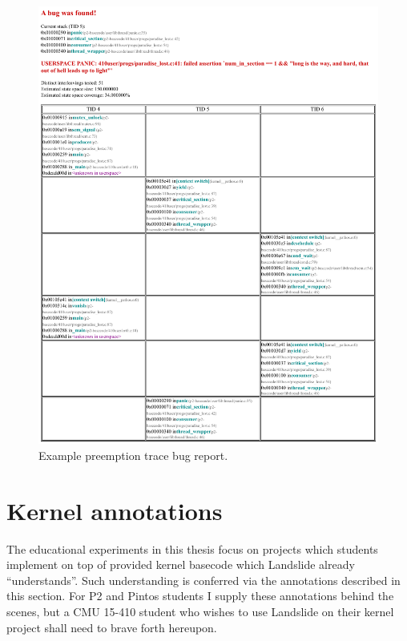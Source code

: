 \begin{figure}[t]
	\begin{center}
		\includegraphics[width=\textwidth]{bugreport.pdf}
	\end{center}
	\caption{Example preemption trace bug report.}
	\label{fig:bugreport}
\end{figure}


\section{Kernel annotations}

The educational experiments in this thesis focus on projects which students implement on top of provided kernel basecode which Landslide already ``understands''.
Such understanding is conferred via the annotations described in this section.
For P2 and Pintos students I supply these annotations behind the scenes,
but a CMU 15-410 student who wishes to use Landslide on their kernel project shall need to brave forth hereupon.

